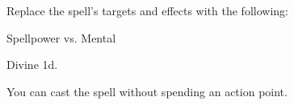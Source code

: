 Replace the spell's targets and effects with the following:
\begin{spellcontent}

\begin{augmenttargetinginfo}




\end{augmenttargetinginfo}


\begin{augmenteffects}




\begin{spellattack}{Spellpower vs. Mental}


\hit Divine  \minus1d.


\end{spellattack}



\end{augmenteffects}

\end{spellcontent}





You can cast the spell without spending an action point.




